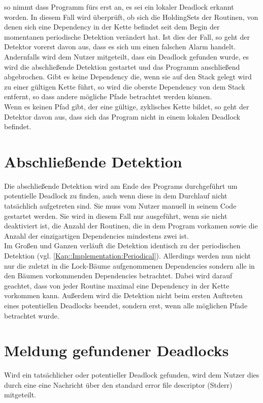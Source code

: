 so nimmt dass Programm fürs erst an, es sei ein lokaler Deadlock erkannt worden.
In diesem Fall wird überprüft, ob sich die HoldingSets der Routinen, von denen
sich eine Dependency in der Kette befindet seit dem Begin der momentanen 
periodische Detektion verändert hat. Ist dies der Fall, so geht der Detektor 
vorerst davon aus, dass es sich um einen falschen Alarm handelt. Andernfalls 
wird dem Nutzer mitgeteilt, dass ein Deadlock gefunden wurde, es wird die 
abschließende Detektion gestartet und das Programm anschließend abgebrochen.
Gibt es keine Dependency die, wenn sie auf den Stack gelegt wird zu einer 
gültigen Kette führt, so wird die oberste Dependency von dem Stack entfernt,
so dass andere mögliche Pfade betrachtet werden können.\\
Wenn es keinen Pfad gibt, der eine gültige, zyklisches Kette bildet, so geht 
der Detektor davon aus, dass sich das Program nicht in einem lokalen Deadlock
befindet.

\section{Abschließende Detektion}
Die abschließende Detektion wird am Ende des Programs durchgeführt um 
potentielle Deadlock zu finden, auch wenn diese in dem Durchlauf nicht 
tatsächlich aufgetreten sind. Sie muss vom Nutzer manuell in seinem Code 
gestartet werden. Sie wird in diesem Fall nur ausgeführt, wenn sie nicht 
deaktiviert ist, die Anzahl der Routinen, die in dem Program vorkamen 
sowie die Anzahl der einzigartigen Dependencies mindestens zwei ist.\\
Im Großen und Ganzen verläuft die Detektion 
identisch zu der periodischen Detektion (vgl. \ref{Kap::Implementation:Periodical}).
Allerdings werden nun nicht nur die zuletzt in die Lock-Bäume aufgenommenen 
Dependencies sondern alle in den Bäumen vorkommenden Dependencies betrachtet. 
Dabei wird darauf geachtet, dass von jeder Routine maximal eine 
Dependency in der Kette vorkommen kann. Außerdem wird die Detektion nicht beim 
ersten Auftreten eines potentiellen Deadlocks beendet, sondern erst, wenn alle 
möglichen Pfade betrachtet wurde.


\section{Meldung gefundener Deadlocks}\label{Kap::Implementation:Report}
Wird ein tatsächlicher oder potentieller Deadlock gefunden, wird dem Nutzer 
dies durch eine eine Nachricht über den standard error file descriptor (Stderr)
mitgeteilt.
